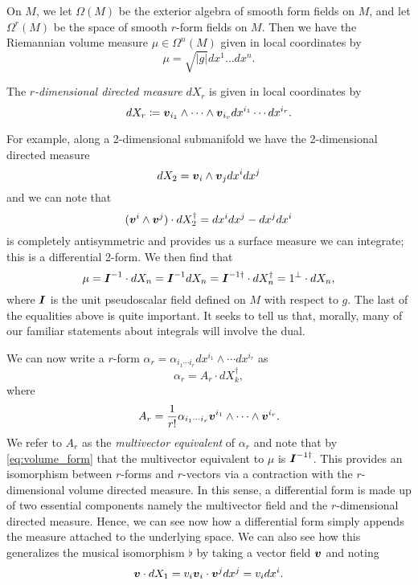 On $M$, we let $\Omega(M)$ be the exterior algebra of smooth form fields on $M$, and let $\Omega^r(M)$ be the space of smooth $r$-form fields on $M$. Then we have the Riemannian volume measure $\mu \in \Omega^n(M)$ given in local coordinates by
\begin{equation}
\mu = \sqrt{|g|} dx^1\dots dx^n.
\end{equation}
\begin{definition}
The \emph{$r$-dimensional directed measure} $dX_r$ is given in local coordinates by
\begin{equation}
    dX_r \coloneqq \boldsymbol{v}_{i_1} \wedge \cdots \wedge \boldsymbol{v}_{i_r} dx^{i_1} \cdots dx^{i_r}. 
\end{equation}
\end{definition}
For example, along a 2-dimensional submanifold we have the 2-dimensional directed measure 
\begin{equation}
    dX_2 = \boldsymbol{v}_i \wedge \boldsymbol{v}_j dx^i dx^j
\end{equation}
and we can note that 
\begin{equation}
(\boldsymbol{v}^i \wedge \boldsymbol{v}^j)\cdot dX_2^\dagger = dx^idx^j - dx^j dx^i
\end{equation}
is completely antisymmetric and provides us a surface measure we can integrate; this is a differential 2-form. We then find that
\begin{equation}
\label{eq:volume_form}
\mu = \boldsymbol{I}^{-1} \cdot dX_n = \boldsymbol{I}^{-1} dX_n = \boldsymbol{I}^{-1 \dagger} \cdot dX_n^\dagger = 1^\perp \cdot dX_n,
\end{equation}
where $\boldsymbol{I}$ is the unit pseudoscalar field defined on $M$ with respect to $g$. The last of the equalities above is quite important. It seeks to tell us that, morally, many of our familiar statements about integrals will involve the dual.

We can now write a $r$-form $\alpha_r = \alpha_{i_1 \cdots i_r} dx^{i_1}\wedge \cdots dx^{i_r}$ as 
\begin{equation}
\alpha_r = A_r \cdot dX_k^\dagger,
\end{equation}
where
\begin{equation}
A_r = \frac{1}{r!} \alpha_{i_1 \cdots i_r} \boldsymbol{v}^{i_1} \wedge \cdots \wedge \boldsymbol{v}^{i_r}.
\end{equation}
We refer to $A_r$ as the \emph{multivector equivalent} of $\alpha_r$ and note that by \cref{eq:volume_form} that the multivector equivalent to $\mu$ is $\boldsymbol{I}^{-1 \dagger}$. This provides an isomorphism between $r$-forms and $r$-vectors via a contraction with the $r$-dimensional volume directed measure. In this sense, a differential form is made up of two essential components namely the multivector field and the $r$-dimensional directed measure. Hence, we can see now how a differential form simply appends the measure attached to the underlying space. We can also see how this generalizes the musical isomorphism $\flat$ by taking a vector field $\boldsymbol{v}$ and noting
\begin{equation}
\label{eq:line_element}
\boldsymbol{v} \cdot dX_1 = v_i  \boldsymbol{v}_i \cdot \boldsymbol{v}^j dx^j = v_i dx^i.
\end{equation}

